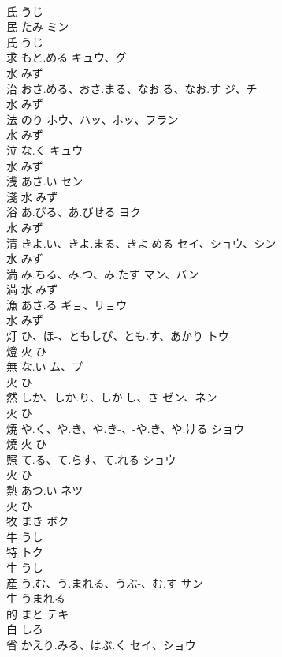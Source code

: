 \documentclass[8pt]{extreport}
\begin{document}
\begin{CJK}{UTF8}{min}
\\	氏		うじ		
\\	民	たみ	ミン	
\\	氏		うじ		
\\	求	もと.める	キュウ、グ	
\\	水		みず		
\\	治	おさ.める、おさ.まる、なお.る、なお.す	ジ、チ	
\\	水		みず		
\\	法	のり	ホウ、ハッ、ホッ、フラン	
\\	水		みず		
\\	泣	な.く	キュウ	
\\	水		みず		
\\	浅	あさ.い	セン	
\\	淺	水		みず		
\\	浴	あ.びる、あ.びせる	ヨク	
\\	水		みず		
\\	清	きよ.い、きよ.まる、きよ.める	セイ、ショウ、シン	
\\	水		みず		
\\	満	み.ちる、み.つ、み.たす	マン、バン	
\\	滿	水		みず		
\\	漁	あさ.る	ギョ、リョウ	
\\	水		みず		
\\	灯	ひ、ほ-、ともしび、とも.す、あかり	トウ	
\\	燈	火		ひ		
\\	無	な.い	ム、ブ	
\\	火		ひ		
\\	然	しか、しか.り、しか.し、さ	ゼン、ネン	
\\	火		ひ		
\\	焼	や.く、や.き、や.き-、-や.き、や.ける	ショウ	
\\	燒	火		ひ		
\\	照	て.る、て.らす、て.れる	ショウ	
\\	火		ひ		
\\	熱	あつ.い	ネツ	
\\	火		ひ		
\\	牧	まき	ボク	
\\	牛		うし		
\\	特		トク	
\\	牛		うし		
\\	産	う.む、う.まれる、うぶ-、む.す	サン	
\\	生		うまれる		
\\	的	まと	テキ	
\\	白		しろ		
\\	省	かえり.みる、はぶ.く	セイ、ショウ	

\end{CJK}
\end{document}
